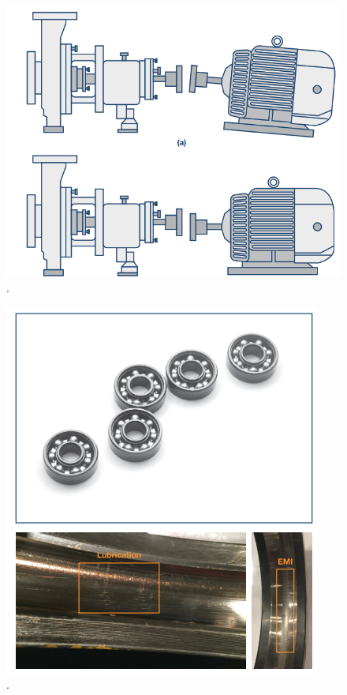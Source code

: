 \begin{figure}[H]
    \caption{.}
    \begin{center}
        \includegraphics[scale=.45]{referencial/img/misadraw_analog_p2.png}
    \end{center}
    \label{fig:}
\end{figure}


\begin{figure}[H]
    \caption{.}
    \begin{center}
        \includegraphics[scale=.5]{referencial/img/bearing_analog_p3.png}
    \end{center}
    \label{fig:}
\end{figure}

